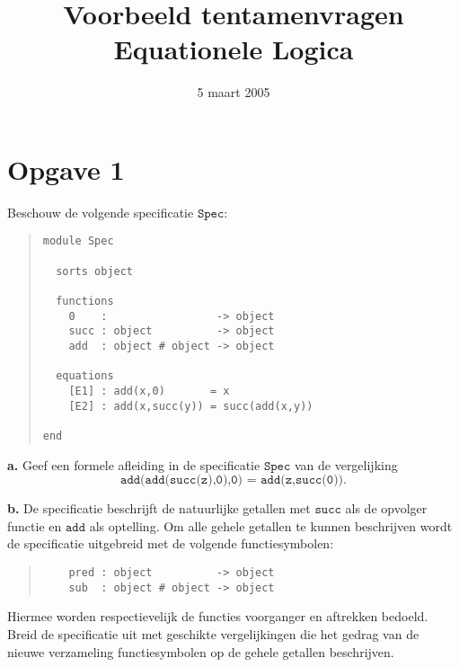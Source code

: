 \documentclass[a4paper,11pt]{article}
\title{Voorbeeld tentamenvragen Equationele Logica}
\date{5 maart 2005}
\begin{document}
\maketitle


\section*{Opgave 1}

Beschouw de volgende specificatie $\texttt{Spec}$:

\begin{quote}
\begin{verbatim}
module Spec

  sorts object

  functions
    0    :                 -> object
    succ : object          -> object
    add  : object # object -> object

  equations
    [E1] : add(x,0)       = x
    [E2] : add(x,succ(y)) = succ(add(x,y))

end 
\end{verbatim}
\end{quote}

\begin{description}

\item{\bf a.}
Geef een formele afleiding in de specificatie $\texttt{Spec}$ van de
vergelijking
\begin{displaymath}
\texttt{add(add(succ(z),0),0) = add(z,succ(0))}.
\end{displaymath}

\item{\bf b.}
De specificatie beschrijft de natuurlijke getallen met $\texttt{succ}$ als de
opvolger functie en $\texttt{add}$ als optelling. Om alle gehele getallen te
kunnen beschrijven wordt de specificatie uitgebreid met de volgende
functiesymbolen:

\begin{quote}
\begin{verbatim}
    pred : object          -> object
    sub  : object # object -> object
\end{verbatim}
\end{quote}

Hiermee worden respectievelijk de functies voorganger en aftrekken
bedoeld. Breid de specificatie uit met geschikte vergelijkingen die het gedrag
van de nieuwe verzameling functiesymbolen op de gehele getallen beschrijven.

\end{description}
\end{document}

